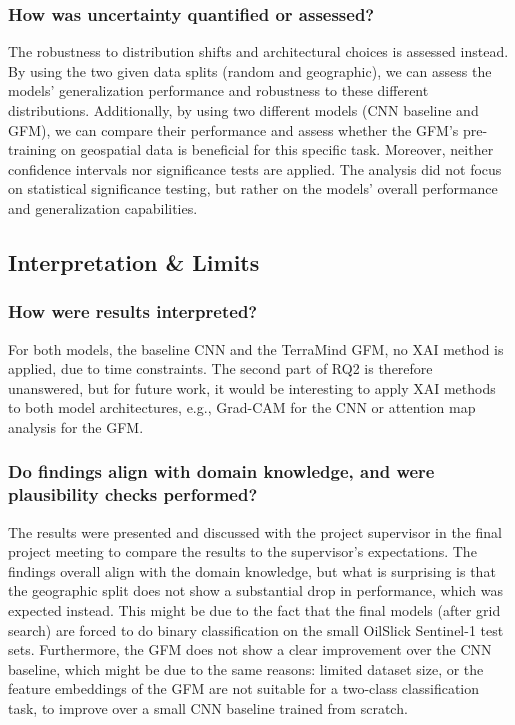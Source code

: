 \documentclass[sigconf]{acmart}
\begin{document}
\subsubsection{How was uncertainty quantified or assessed?} The robustness to distribution shifts and architectural choices is assessed instead. By using the two given data splits (random and geographic), we can assess the models' generalization performance and robustness to these different distributions. Additionally, by using two different models (CNN baseline and GFM), we can compare their performance and assess whether the GFM's pre-training on geospatial data is beneficial for this specific task. Moreover, neither confidence intervals nor significance tests are applied. The analysis did not focus on statistical significance testing, but rather on the models' overall performance and generalization capabilities.

\subsection{Interpretation \& Limits}
\subsubsection{How were results interpreted?} For both models, the baseline CNN and the TerraMind GFM, no XAI method is applied, due to time constraints. The second part of RQ2 is therefore unanswered, but for future work, it would be interesting to apply XAI methods to both model architectures, e.g., Grad-CAM for the CNN or attention map analysis for the GFM.

\subsubsection{Do findings align with domain knowledge, and were plausibility checks performed?} The results were presented and discussed with the project supervisor in the final project meeting to compare the results to the supervisor's expectations. The findings overall align with the domain knowledge, but what is surprising is that the geographic split does not show a substantial drop in performance, which was expected instead. This might be due to the fact that the final models (after grid search) are forced to do binary classification on the small OilSlick Sentinel-1 test sets. Furthermore, the GFM does not show a clear improvement over the CNN baseline, which might be due to the same reasons: limited dataset size, or the feature embeddings of the GFM are not suitable for a two-class classification task, to improve over a small CNN baseline trained from scratch.
\end{document}
